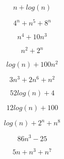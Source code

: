 \documentclass{article}
\begin{document}
\LARGE


$$n + log(n)$$

$$4^n+n^5+8^n$$

$$n^4+10n^3$$

$$n^2+2^n$$

$$log(n)+100n^2$$

$$3n^3+2n^6+n^2$$

$$52 log(n)+4$$

$$12 log(n)+100$$

$$log(n)+2^n+n^8$$

$$86 n^3-25$$

$$5n+n^3+n^7$$
\end{document}
